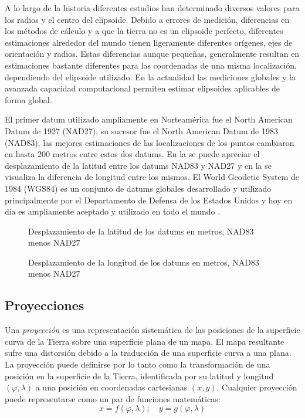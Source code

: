 A lo largo de la historia diferentes estudios han determinado diversos valores para los radios y el centro del elipsoide. Debido a errores de medición, diferencias en los métodos de cálculo y a que la tierra no es un elipsoide perfecto, diferentes estimaciones alrededor del mundo tienen ligeramente diferentes orígenes, ejes de orientación y radios. Estas diferencias aunque pequeñas, generalmente resultan en estimaciones bastante diferentes para las coordenadas de una misma localización, dependiendo del elipsoide utilizado. En la actualidad las mediciones globales y la avanzada capacidad computacional permiten estimar elipsoides aplicables de forma global.

El primer datum utilizado ampliamente en Norteamérica fue el North American Datum de 1927 (NAD27), su sucesor fue el North American Datum de 1983 (NAD83), las mejores estimaciones de las localizaciones de los puntos cambiaron en hasta 200 metros entre estos dos datums. En la  se puede apreciar el desplazamiento de la latitud entre los datums NAD83 y NAD27 y en la  se visualiza la diferencia de longitud entre los mismos. El World Geodetic System de 1984 (WGS84) es un conjunto de datums globales desarrollado y utilizado principalmente por el Departamento de Defensa de los Estados Unidos y hoy en día es ampliamente aceptado y utilizado en todo el mundo \cite{longley2005geographic}.

\begin{figure}[h]
	\centering
	
	\caption[Desplazamiento de la latitud entre NAD83 y NAD27]{Desplazamiento de la latitud de los datums en metros, NAD83 menos NAD27}
	\label{fig:datum-latitud} 
\end{figure}

\begin{figure}[h]
	\centering
	
	\caption[Desplazamiento de la longitud entre NAD83 y NAD27]{Desplazamiento de la longitud de los datums en metros, NAD83 menos NAD27}
	\label{fig:datum-longitud} 
\end{figure}

\subsection{Proyecciones}

Una \emph{proyección} es una representación sistemática de las posiciones de la superficie curva de la Tierra sobre una superficie plana de un mapa. El mapa resultante sufre una distorsión debido a la traducción de una superficie curva a una plana. La proyección puede definirse por lo tanto como la transformación de una posición en la superficie de la Tierra, identificada por su latitud y longitud $(\varphi,\lambda)$ a una posición en coordenadas cartesianas $(x,y)$. Cualquier proyección puede representarse como un par de funciones matemáticas: \begin{displaymath} x=f(\varphi,\lambda );\quad y=g(\varphi,\lambda ) \end{displaymath}

